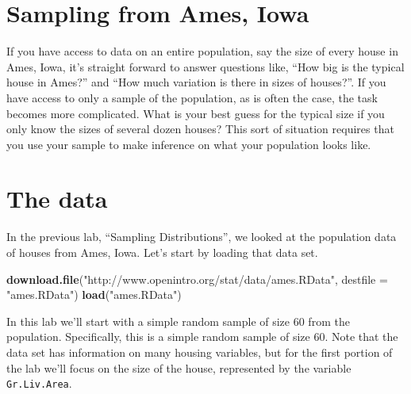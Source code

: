 \documentclass[]{book}
\newenvironment{Shaded}{\begin{snugshade}}{\end{snugshade}}
\newcommand{\DataTypeTok}[1]{\textcolor[rgb]{0.13,0.29,0.53}{#1}}
\newcommand{\DecValTok}[1]{\textcolor[rgb]{0.00,0.00,0.81}{#1}}
\newcommand{\KeywordTok}[1]{\textcolor[rgb]{0.13,0.29,0.53}{\textbf{#1}}}
\newcommand{\NormalTok}[1]{#1}
\newcommand{\OperatorTok}[1]{\textcolor[rgb]{0.81,0.36,0.00}{\textbf{#1}}}
\newcommand{\StringTok}[1]{\textcolor[rgb]{0.31,0.60,0.02}{#1}}
\theoremstyle{definition}
\theoremstyle{definition}
\theoremstyle{definition}
\theoremstyle{remark}
\begin{document}
\hypertarget{sampling-from-ames-iowa}{%
\section{Sampling from Ames, Iowa}\label{sampling-from-ames-iowa}}

If you have access to data on an entire population, say the size of
every house in Ames, Iowa, it's straight forward to answer questions
like, ``How big is the typical house in Ames?'' and ``How much variation
is there in sizes of houses?''. If you have access to only a sample of
the population, as is often the case, the task becomes more complicated.
What is your best guess for the typical size if you only know the sizes
of several dozen houses? This sort of situation requires that you use
your sample to make inference on what your population looks like.

\hypertarget{the-data-2}{%
\section{The data}\label{the-data-2}}

In the previous lab, ``Sampling Distributions'', we looked at the
population data of houses from Ames, Iowa. Let's start by loading that
data set.

\begin{Shaded}
\begin{Highlighting}[]
\KeywordTok{download.file}\NormalTok{(}\StringTok{"http://www.openintro.org/stat/data/ames.RData"}\NormalTok{, }\DataTypeTok{destfile =} \StringTok{"ames.RData"}\NormalTok{)}
\KeywordTok{load}\NormalTok{(}\StringTok{"ames.RData"}\NormalTok{)}
\end{Highlighting}
\end{Shaded}

In this lab we'll start with a simple random sample of size 60 from the
population. Specifically, this is a simple random sample of size 60.
Note that the data set has information on many housing variables, but
for the first portion of the lab we'll focus on the size of the house,
represented by the variable \texttt{Gr.Liv.Area}.

\begin{Shaded}
\end{Shaded}
\end{document}
